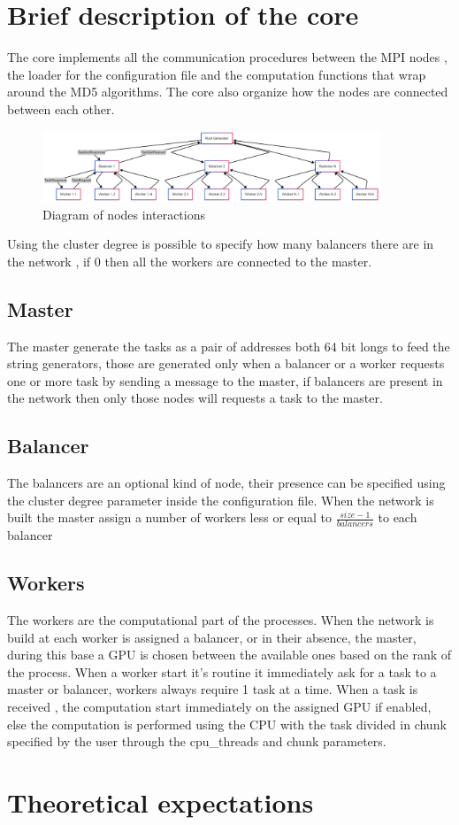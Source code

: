 \documentclass[12pt,a4paper]{article}
\begin{document}
\section{Brief description of the core}
The core implements all the communication procedures between the MPI nodes , the loader for the configuration file and the computation functions that wrap around the MD5 algorithms. The core also organize how the nodes are connected between each other.
\\
\begin{figure}[H]
    \includegraphics[width=0.9\textwidth]{images/diagram_with_balancers.png}
    \caption{Diagram of nodes interactions}
\end{figure}

Using the cluster degree is possible to specify how many balancers there are in the network , if 0 then all the workers are connected to the master. 

\subsection{Master}

The master generate the tasks as a pair of addresses both 64 bit longs to feed the string generators, those are generated only when a balancer or a worker requests one or more task by sending a message to the master, if balancers are present in the network then only those nodes will requests a task to the master.

\subsection{Balancer}
The balancers are an optional kind of node, their presence can be specified using the cluster degree parameter inside the configuration file. When the network is built the master assign a number of workers less or equal to $\frac{size-1}{balancers}$ to each balancer

\subsection{Workers}
The workers are the computational part of the processes. When the network is build at each worker is assigned a balancer, or in their absence, the master, during this base a GPU is chosen between the available ones based on the rank of the process. When a worker start it's routine it immediately ask for a task to a master or balancer, workers always require 1 task at a time. When a task is received , the computation start immediately on the assigned GPU if enabled, else the computation is performed using the CPU with the task divided in chunk specified by the user through the cpu_threads and chunk parameters.


\section{Theoretical expectations}
\end{document}
